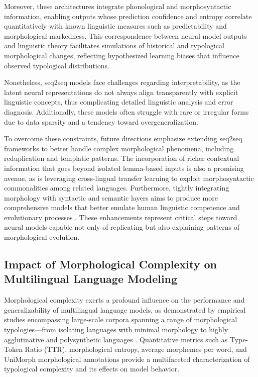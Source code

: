 \documentclass[sigconf]{acmart}
\begin{document}
Moreover, these architectures integrate phonological and morphosyntactic information, enabling outputs whose prediction confidence and entropy correlate quantitatively with known linguistic measures such as predictability and morphological markedness. This correspondence between neural model outputs and linguistic theory facilitates simulations of historical and typological morphological changes, reflecting hypothesized learning biases that influence observed typological distributions.

Nonetheless, seq2seq models face challenges regarding interpretability, as the latent neural representations do not always align transparently with explicit linguistic concepts, thus complicating detailed linguistic analysis and error diagnosis. Additionally, these models often struggle with rare or irregular forms due to data sparsity and a tendency toward overgeneralization. 

To overcome these constraints, future directions emphasize extending seq2seq frameworks to better handle complex morphological phenomena, including reduplication and templatic patterns. The incorporation of richer contextual information that goes beyond isolated lemma-based inputs is also a promising avenue, as is leveraging cross-lingual transfer learning to exploit morphosyntactic commonalities among related languages. Furthermore, tightly integrating morphology with syntactic and semantic layers aims to produce more comprehensive models that better emulate human linguistic competence and evolutionary processes \cite{ref42}. These enhancements represent critical steps toward neural models capable not only of replicating but also explaining patterns of morphological evolution.

\subsection{Impact of Morphological Complexity on Multilingual Language Modeling}

Morphological complexity exerts a profound influence on the performance and generalizability of multilingual language models, as demonstrated by empirical studies encompassing large-scale corpora spanning a range of morphological typologies—from isolating languages with minimal morphology to highly agglutinative and polysynthetic languages \cite{ref34}. Quantitative metrics such as Type-Token Ratio (TTR), morphological entropy, average morphemes per word, and UniMorph morphological annotations provide a multifaceted characterization of typological complexity and its effects on model behavior.
\end{document}
